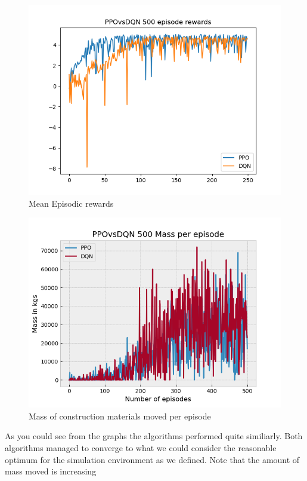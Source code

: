 \documentclass[conference]{IEEEtran}
\begin{document}
\begin{figure}[h!]
	\includegraphics[width=\columnwidth]{graphs/PPOvsDQN250.png}
	\caption{Mean Episodic rewards}
\end{figure}
\begin{figure}[h!]
	\includegraphics[width=\columnwidth]{graphs/PPOvsDQN500mass.png}
	\caption{Mass of construction materials moved per episode}
\end{figure}

As you could see from the graphs the algorithms performed quite similiarly.
Both algorithms managed to converge to what we could consider the reasonable optimum for the simulation
environment as we defined. Note that the amount of mass moved is increasing
\end{document}

